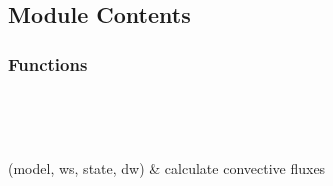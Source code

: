 \documentclass[letterpaper,10pt,english]{sphinxmanual}
\begin{document}
\section{}
\label{\detokenize{autoapi/eflux/index:module-eflux}}\label{\detokenize{autoapi/eflux/index:eflux}}\label{\detokenize{autoapi/eflux/index::doc}}

\subsection{Module Contents}
\label{\detokenize{autoapi/eflux/index:module-contents}}

\subsubsection{Functions}
\label{\detokenize{autoapi/eflux/index:functions}}

\begin{savenotes}\sphinxatlongtablestart\begin{longtable}[c]{}
\hline

\endfirsthead

%
{}\\
\hline

\endhead

\hline
{}\\
\endfoot

\endlastfoot

\sphinxAtStartPar
{\hyperref[\detokenize{autoapi/eflux/index:eflux.eflux}]{}}(model, ws, state, dw)
&
\sphinxAtStartPar
calculate convective fluxes
\\
\hline
\end{longtable}\sphinxatlongtableend\end{savenotes}
\end{document}
